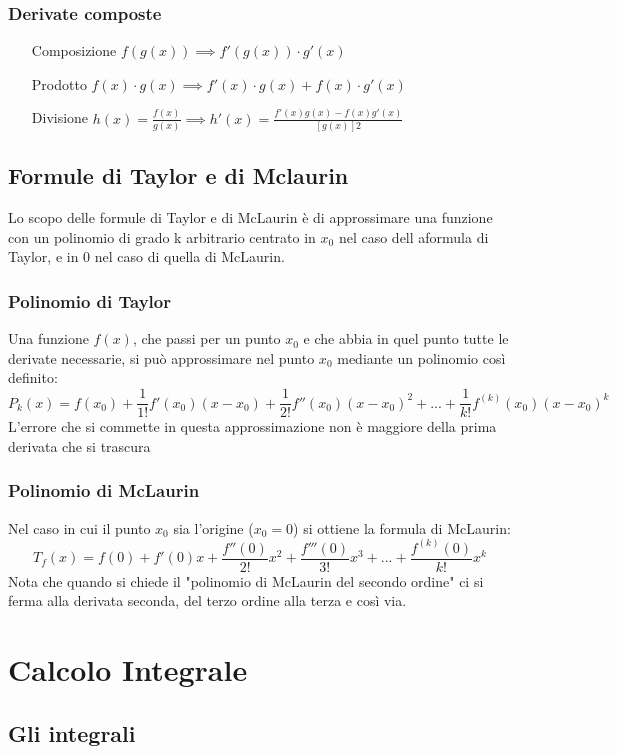 \documentclass[12pt, a4paper, openany]{book}
\begin{document}
	\subsection*{Derivate composte}
	\begin{itemize}
		\item[Composizione] $f(g(x)) \implies f'(g(x)) \cdot g'(x)$
		\item[Prodotto] $f(x) \cdot g(x) \implies f'(x) \cdot g(x) + f(x) \cdot g'(x)$
  		\item[Divisione] $h(x)=\frac{f(x)}{g(x)} \implies h'(x) = \frac{f'(x)g(x) - f(x)g'(x)}{[g(x)]2}$
	\end{itemize}



	\section{Formule di Taylor e di Mclaurin}
	Lo scopo delle formule di Taylor e di McLaurin è di approssimare una funzione con un polinomio di grado k arbitrario centrato in $x_0$ nel caso dell aformula di Taylor,
	e in 0 nel caso di quella di McLaurin.
	\subsection*{Polinomio di Taylor}
	Una funzione $f(x)$, che passi per un punto $x_0$ e che abbia in quel punto tutte le derivate necessarie,
	si può approssimare nel punto $x_0$ mediante un polinomio così definito:
	$$P_k(x)=f(x_0)+\frac{1}{1!}f'(x_0)(x-x_0) + \frac{1}{2!}f''(x_0)(x-x_0)^2 +... + \frac{1}{k!}f^{(k)}(x_0)(x-x_0)^k$$
	L'errore che si commette in questa approssimazione non è maggiore della prima derivata che si trascura
	\subsection*{Polinomio di McLaurin}
	Nel caso in cui il punto $x_0$ sia l'origine ($x_0=0$) si ottiene la formula di McLaurin:
	$$T_f(x) = f(0) + f'(0)x + \frac{f''(0)}{2!}x^2 + \frac{f'''(0)}{3!}x^3+...+ \frac{f^{(k)}(0)}{k!}x^k$$
	Nota che quando si chiede il "polinomio di McLaurin del secondo ordine" ci si ferma alla derivata seconda, del terzo ordine alla terza e così via.
	\chapter{Calcolo Integrale}
	\section{Gli integrali}
\end{document}
